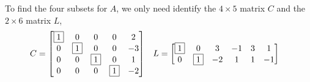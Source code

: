 \documentclass{ximera}
\begin{document}
\begin{example}
  To find the four subsets for $A$, we only need identify the
  $4\times 5$ matrix $C$ and the $2\times 6$ matrix $L$,
  \begin{align*}
    C&=
       \begin{bmatrix}
         \fbox{1} & 0 & 0 & 0 & 2\\
         0 & \fbox{1} & 0 & 0 & -3\\
         0 & 0 & \fbox{1} & 0 & 1\\
         0 & 0 & 0 & \fbox{1} & -2
       \end{bmatrix}
                                 &
                                   L&=
                                      \begin{bmatrix}
                                        \fbox{1} & 0 & 3 & -1 & 3 & 1 \\
                                        0 & \fbox{1} & -2 & 1 & 1 & -1
                                      \end{bmatrix}
  \end{align*}


\end{example}
\end{document}
